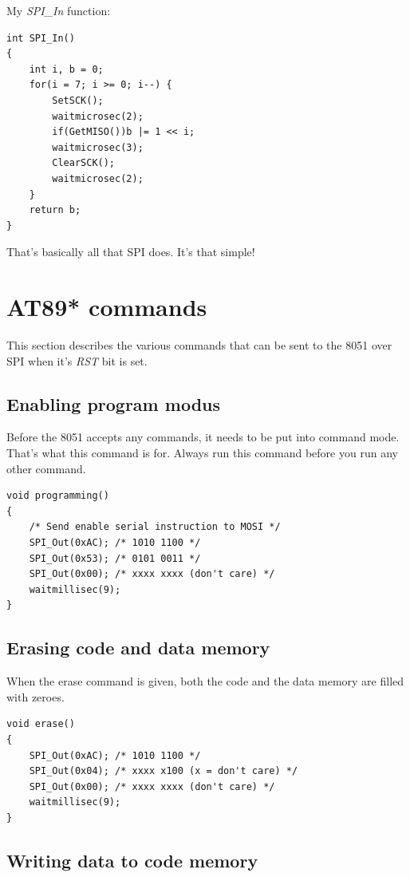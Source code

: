 \documentclass[a4paper]{article}
\begin{document}
My {\em SPI\_In} function:

\begin{lstlisting}
int SPI_In()
{
	int i, b = 0;
	for(i = 7; i >= 0; i--) {
		SetSCK();
		waitmicrosec(2);
		if(GetMISO())b |= 1 << i;
		waitmicrosec(3);
		ClearSCK();
		waitmicrosec(2);
	}
	return b;
}
\end{lstlisting}

That's basically all that SPI does. It's that simple!

\section{AT89* commands}

This section describes the various commands that can be sent 
to the 8051 over SPI when it's {\em RST} bit is set.

\subsection{Enabling program modus}

Before the 8051 accepts any commands, it needs to be put into command mode.
That's what this command is for. Always run this command before you 
run any other command.

\begin{lstlisting}
void programming()
{
	/* Send enable serial instruction to MOSI */
	SPI_Out(0xAC); /* 1010 1100 */
	SPI_Out(0x53); /* 0101 0011 */
	SPI_Out(0x00); /* xxxx xxxx (don't care) */
	waitmillisec(9);
}
\end{lstlisting}

\subsection{Erasing code and data memory}

When the erase command is given, both the code and the data memory 
are filled with zeroes.

\begin{lstlisting}
void erase()
{
	SPI_Out(0xAC); /* 1010 1100 */
	SPI_Out(0x04); /* xxxx x100 (x = don't care) */
	SPI_Out(0x00); /* xxxx xxxx (don't care) */
	waitmillisec(9);
}
\end{lstlisting}


\subsection{Writing data to code memory}
\end{document}
